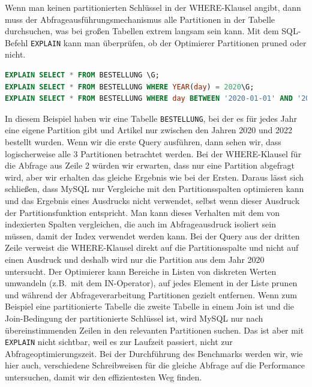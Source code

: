 Wenn man keinen partitionierten Schlüssel in der WHERE-Klausel angibt, dann muss der Abfrageausführungsmechanismus alle Partitionen in der Tabelle durchsuchen, was bei großen Tabellen extrem langsam sein kann.
Mit dem SQL-Befehl \texttt{EXPLAIN} kann man überprüfen, ob der Optimierer Partitionen pruned oder nicht.

\vspace{-5pt}
\begin{lstlisting}[language=SQL,caption=Unterschiedliche Ausführungspläne,label={lst:explain_partition}]
EXPLAIN SELECT * FROM BESTELLUNG \G;
EXPLAIN SELECT * FROM BESTELLUNG WHERE YEAR(day) = 2020\G;
EXPLAIN SELECT * FROM BESTELLUNG WHERE day BETWEEN '2020-01-01' AND '2020-12-31'\G;
\end{lstlisting}
\vspace{-5pt}

In diesem Beispiel haben wir eine Tabelle \texttt{BESTELLUNG}, bei der es für jedes Jahr eine eigene Partition gibt und Artikel nur zwischen den Jahren 2020 und 2022 bestellt wurden.
Wenn wir die erste Query ausführen, dann sehen wir, dass logischerweise alle 3 Partitionen betrachtet werden.
Bei der WHERE-Klausel für die Abfrage aus Zeile 2 würden wir erwarten, dass nur eine Partition abgefragt wird, aber wir erhalten das gleiche Ergebnis wie bei der Ersten.
Daraus lässt sich schließen, dass MySQL nur Vergleiche mit den Partitionsspalten optimieren kann und das Ergebnis eines Ausdrucks nicht verwendet, selbst wenn dieser Ausdruck der Partitionsfunktion entspricht.
Man kann dieses Verhalten mit dem von indexierten Spalten vergleichen, die auch im Abfrageausdruck isoliert sein müssen, damit der Index verwendet werden kann.
Bei der Query aus der dritten Zeile verweist die WHERE-Klausel direkt auf die Partitionsspalte und nicht auf einen Ausdruck und deshalb wird nur die Partition aus dem Jahr 2020 untersucht.
Der Optimierer kann Bereiche in Listen von diskreten Werten umwandeln (z.B.\ mit dem IN-Operator), auf jedes Element in der Liste prunen und während der Abfrageverarbeitung Partitionen gezielt entfernen.
Wenn zum Beispiel eine partitionierte Tabelle die zweite Tabelle in einem Join ist und die Join-Bedingung der partitionierte Schlüssel ist, wird MySQL nur nach übereinstimmenden Zeilen in den relevanten Partitionen suchen.
Das ist aber mit \texttt{EXPLAIN} nicht sichtbar, weil es zur Laufzeit passiert, nicht zur Abfrageoptimierungszeit.
Bei der Durchführung des Benchmarks werden wir, wie hier auch, verschiedene Schreibweisen für die gleiche Abfrage auf die Performance untersuchen, damit wir den effizientesten Weg finden.

